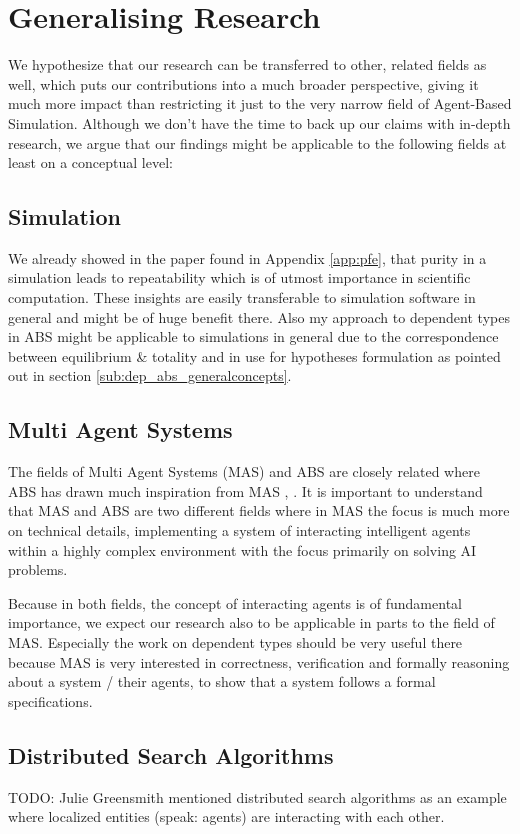 \chapter{Generalising Research}
\label{chap:generalising}

We hypothesize that our research can be transferred to other, related fields as well, which puts our contributions into a much broader perspective, giving it much more impact than restricting it just to the very narrow field of Agent-Based Simulation. Although we don't have the time to back up our claims with in-depth research, we argue that our findings might be applicable to the following fields at least on a conceptual level:

\section{Simulation}
We already showed in the paper found in Appendix \ref{app:pfe}, that purity in a simulation leads to repeatability which is of utmost importance in scientific computation. These insights are easily transferable to simulation software in general and might be of huge benefit there. Also my approach to dependent types in ABS might be applicable to simulations in general due to the correspondence between equilibrium \& totality and in use for hypotheses formulation as pointed out in section \ref{sub:dep_abs_generalconcepts}. 

\section{Multi Agent Systems}
The fields of Multi Agent Systems (MAS) and ABS are closely related where ABS has drawn much inspiration from MAS \cite{wooldridge_introduction_2009}, \cite{weiss_multiagent_2013}. It is important to understand that MAS and ABS are two different fields where in MAS the focus is much more on technical details, implementing a system of interacting intelligent agents within a highly complex environment with the focus primarily on solving AI problems.

Because in both fields, the concept of interacting agents is of fundamental importance, we expect our research also to be applicable in parts to the field of MAS. Especially the work on dependent types should be very useful there because MAS is very interested in correctness, verification and formally reasoning about a system / their agents, to show that a system follows a formal specifications.

\section{Distributed Search Algorithms}
TODO: Julie Greensmith mentioned distributed search algorithms as an example where localized entities (speak: agents) are interacting with each other.